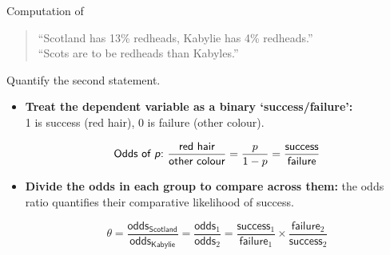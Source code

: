 \documentclass[t]{beamer}
\begin{document}
	\begin{frame}[t]{Computation of }
					
		\begin{quote}
		``Scotland has 13\% redheads, Kabylie has 4\% redheads.''\\
		``Scots are  to be redheads than Kabyles.''
		\end{quote}
		
		Quantify the second statement.

		\begin{itemize}
			\item \textbf{Treat the dependent variable as a binary `success/failure':}\\1 is success (red hair), 0 is failure (other colour).
						
			$$\textsf{Odds of \textit{p}:~}\frac{\textsf{red hair}}{\textsf{other colour}}=\frac{p}{1-p}=\frac{\textsf{success}}{\textsf{failure}}$$
			\vspace{0em}
			
			\item \textbf{Divide the odds in each group to compare across them:} the odds ratio quantifies their comparative likelihood of success.
			
			$$\theta = \frac{\textsf{odds}_{\textsf{Scotland}}}{\textsf{odds}_{\textsf{Kabylie}}}=\frac{\textsf{odds}_1}{\textsf{odds}_2}=\frac{\textsf{success}_1}{\textsf{failure}_1}\times\frac{\textsf{failure}_2}{\textsf{success}_2}$$
						
		\end{itemize}

	\end{frame}
	
\end{document}
